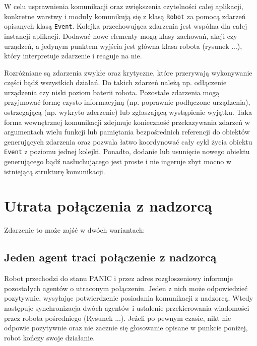 W celu usprawnienia komunikacji oraz zwiększenia czytelności całej aplikacji, konkretne warstwy i moduły komunikują się z klasą {\tt Robot} za pomocą zdarzeń opisanych klasą {\tt Event}. Kolejka przechowująca zdarzenia jest wspólna dla całej instancji aplikacji. Dodawać nowe elementy mogą klasy zachowań, akcji czy urządzeń, a jedynym punktem wyjścia jest główna klasa robota (rysunek ...), który interpretuje zdarzenie i reaguje na nie.


Rozróżniane są zdarzenia zwykłe oraz krytyczne, które przerywają wykonywanie części bądź wszystkich działań. Do takich zdarzeń należą np. odłączenie urządzenia czy niski poziom baterii robota. Pozostałe zdarzenia mogą przyjmować formę czysto informacyjną (np. poprawnie podłączone urządzenia), ostrzegającą (np. wykryto zderzenie) lub zgłaszającą wystąpienie wyjątku. Taka forma wewnętrznej komunikacji zdejmuje konieczność przekazywania zdarzeń w argumentach wielu funkcji lub pamiętania bezpośrednich referencji do obiektów generujących zdarzenia oraz pozwala łatwo koordynować cały cykl życia obiektu {\tt Event} z poziomu jednej kolejki. Ponadto, dodanie lub usunięcie nowego obiektu generującego bądź nasłuchującego jest proste i nie ingeruje zbyt mocno w istniejącą strukturę komunikacji.


\section{Utrata połączenia z nadzorcą}
\label{sec:utrata_polaczenia}

Zdarzenie to może zajść w dwóch wariantach:

\subsection{Jeden agent traci połączenie z nadzorcą}

Robot przechodzi do stanu PANIC i przez adres rozgłoszeniowy informuje pozostałych agentów o utraconym połączeniu. Jeden z nich może odpowiedzieć pozytywnie, wysyłając potwierdzenie posiadania komunikacji z nadzorcą. Wtedy następuje synchronizacja dwóch agentów i ustalenie przekierowania wiadomości przez robota pośredniego (Rysunek ...). Jeżeli po pewnym czasie, nikt nie odpowie pozytywnie oraz nie zacznie się głosowanie opisane w punkcie poniżej, robot kończy swoje działanie.


